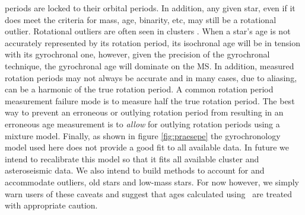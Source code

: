 periods are locked to their orbital periods.
In addition, any given star, even if it does meet the criteria for mass,
age, binarity, etc, may still be a rotational outlier.
Rotational outliers are often seen in clusters \citep[see \eg][]{douglas2016,
rebull2016, douglas2017, rebull2017}.
When a star's age is not accurately represented by its rotation period, its
isochronal age will be in tension with its gyrochronal one, however, given the
precision of the gyrochronal technique, the gyrochronal age will dominate on
the MS.
In addition, measured rotation periods may not always be accurate and in many
cases, due to aliasing, can be a harmonic of the true rotation period.
A common rotation period measurement failure mode is to measure half the true
rotation period.
The best way to prevent an erroneous or outlying rotation period from
resulting in an erroneous age measurement is to {\it allow} for outlying
rotation periods using a mixture model.
Finally, as shown in figure \ref{fig:praesepe} the gyrochronology model used
here \citep{angus2015} does not provide a good fit to all available data.
In future we intend to recalibrate this model so that it fits all available
cluster and asteroseismic data.
We also intend to build methods to account for and accommodate outliers,
old stars and low-mass stars.
For now however, we simply warn users of these caveats and suggest that ages
calculated using \sd\ are treated with appropriate caution.


